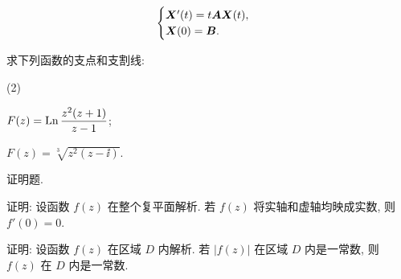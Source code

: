 \begin{homework}
\begin{homework}
\[\begin{cases}
          {\boldsymbol{X}}'(t)=t{\boldsymbol{A}}{\boldsymbol{X}}(t),\\
          {\boldsymbol{X}}(0)={\boldsymbol{B}}.
        \end{cases}
      \]
    \item \optionalex 求下列函数的支点和支割线:
      \begin{subhomework}(2)
        \item $F(z)=\operatorname{Ln}\dfrac{z^2(z+1)}{z-1}$;
        \item $F(z)=\sqrt[3]{z^2(z-\ii)}$.
      \end{subhomework}
  \end{homework}
  \item 证明题.
  \begin{homework}
    \item 证明: 设函数 $f(z)$ 在整个复平面解析. 若 $f(z)$ 将实轴和虚轴均映成实数, 则 $f'(0)=0$. 
    \item 证明: 设函数 $f(z)$ 在区域 $D$ 内解析. 若 $|f(z)|$ 在区域 $D$ 内是一常数, 则 $f(z)$ 在 $D$ 内是一常数.
  \end{homework}
\end{homework}
  

